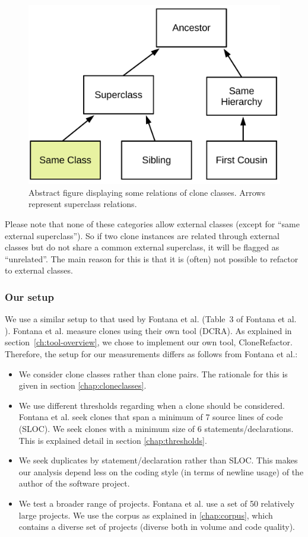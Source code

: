 \documentclass[a4paper]{article}
\begin{document}
\begin{figure}[H]
    \includegraphics[width=1\columnwidth]{img/Relation}
  \caption{Abstract figure displaying some relations of clone classes. Arrows represent superclass relations.}
  \label{fig:clonerelation}
\end{figure}
Please note that none of these categories allow external classes (except for ``same external superclass''). So if two clone instances are related through external classes but do not share a common external superclass, it will be flagged as ``unrelated''. The main reason for this is that it is (often) not possible to refactor to external classes.

\subsubsection{Our setup}\label{chap:oursetup}
We use a similar setup to that used by Fontana et al. (Table~3 of Fontana et al. \cite{fontana2015duplicated}). Fontana et al. measure clones using their own tool (DCRA). As explained in section~\ref{ch:tool-overview}, we chose to implement our own tool, CloneRefactor. Therefore, the setup for our measurements differs as follows from Fontana et al.:
\begin{itemize}
  \item We consider clone classes rather than clone pairs. The rationale for this is given in section \ref{chap:cloneclasses}.
\item We use different thresholds regarding when a clone should be considered. Fontana et al. seek clones that span a minimum of 7 source lines of code (SLOC). We seek clones with a minimum size of 6 statements/declarations. This is explained detail in section \ref{chap:thresholds}.
\item We seek duplicates by statement/declaration rather than SLOC. This makes our analysis depend less on the coding style (in terms of newline usage) of the author of the software project.
\item We test a broader range of projects. Fontana et al. use a set of 50 relatively large projects. We use the corpus as explained in \ref{chap:corpus}, which contains a diverse set of projects (diverse both in volume and code quality).
\end{itemize}
\end{document}
